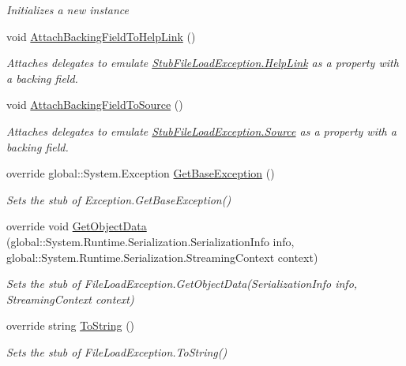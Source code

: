 \begin{DoxyCompactItemize}
\begin{DoxyCompactList}\small\item\em Initializes a new instance\end{DoxyCompactList}\item 
void \hyperlink{class_system_1_1_i_o_1_1_fakes_1_1_stub_file_load_exception_a6146746d2af4a57d51f19d08cd4e355e}{Attach\-Backing\-Field\-To\-Help\-Link} ()
\begin{DoxyCompactList}\small\item\em Attaches delegates to emulate \hyperlink{class_system_1_1_i_o_1_1_fakes_1_1_stub_file_load_exception_a920d7f509aef349a83c1499f0a02ea62}{Stub\-File\-Load\-Exception.\-Help\-Link} as a property with a backing field.\end{DoxyCompactList}\item 
void \hyperlink{class_system_1_1_i_o_1_1_fakes_1_1_stub_file_load_exception_ae0cdff6ebf1b64e6064677f24da865b0}{Attach\-Backing\-Field\-To\-Source} ()
\begin{DoxyCompactList}\small\item\em Attaches delegates to emulate \hyperlink{class_system_1_1_i_o_1_1_fakes_1_1_stub_file_load_exception_a27a9053e5bc71b4116177dceee35a7af}{Stub\-File\-Load\-Exception.\-Source} as a property with a backing field.\end{DoxyCompactList}\item 
override global\-::\-System.\-Exception \hyperlink{class_system_1_1_i_o_1_1_fakes_1_1_stub_file_load_exception_a9cda30d2b4c9afc555e5fd0b77b8a3bb}{Get\-Base\-Exception} ()
\begin{DoxyCompactList}\small\item\em Sets the stub of Exception.\-Get\-Base\-Exception()\end{DoxyCompactList}\item 
override void \hyperlink{class_system_1_1_i_o_1_1_fakes_1_1_stub_file_load_exception_a8b0f2fc03b0e5a876fd711127e527df1}{Get\-Object\-Data} (global\-::\-System.\-Runtime.\-Serialization.\-Serialization\-Info info, global\-::\-System.\-Runtime.\-Serialization.\-Streaming\-Context context)
\begin{DoxyCompactList}\small\item\em Sets the stub of File\-Load\-Exception.\-Get\-Object\-Data(\-Serialization\-Info info, Streaming\-Context context)\end{DoxyCompactList}\item 
override string \hyperlink{class_system_1_1_i_o_1_1_fakes_1_1_stub_file_load_exception_a25f02af29c673d873a07e9660f28b856}{To\-String} ()
\begin{DoxyCompactList}\small\item\em Sets the stub of File\-Load\-Exception.\-To\-String()\end{DoxyCompactList}\end{DoxyCompactItemize}
